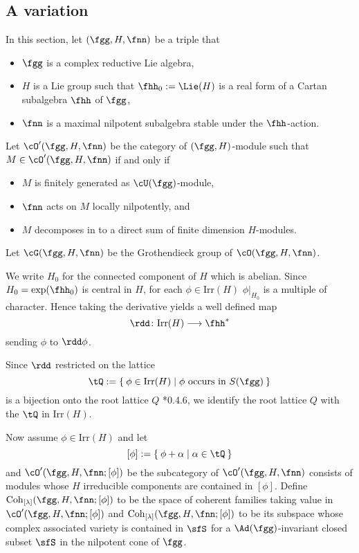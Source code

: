 \documentclass[12pt,a4paper]{amsart}
\numberwithin{equation}{section}
\theoremstyle{remark}
\def\Irr{\mathrm{Irr}}
\def\Coh{\mathrm{Coh}}
\def\dphi{\rdd \phi}
\begin{document}
%



\subsection{A variation}
In this section, let
$(\fgg, H,\fnn)$ be a triple that
\begin{itemize}
  \item $\fgg$ is a complex reductive Lie algebra,
  \item $H$ is a Lie group such that
        $\fhh_{0}:= \Lie(H)$ is a real form of
       a Cartan subalgebra  $\fhh$ of $\fgg$,
  \item $\fnn$ is a maximal nilpotent subalgebra
        stable under the $\fhh$-action.
\end{itemize}
Let $\cO'(\fgg, H,\fnn)$ be the category of $(\fgg, H)$-module such that
$M\in \cO'(\fgg,H,\fnn)$
if and only if
\begin{itemize}
  \item $M$ is finitely generated as $\cU(\fgg)$-module,
  \item $\fnn$ acts on $M$ locally nilpotently, and
  \item $M$ decomposes in to a direct sum of finite dimension $H$-modules.
\end{itemize}
Let $\Grt(\fgg,H,\fnn)$ be the Grothendieck group of $\cO(\fgg,H,\fnn)$.

We write $H_{0}$ for the connected component of $H$ which is abelian.
Since $H_{0} = \exp(\fhh_{0})$ is central in $H$, for each $\phi\in \Irr(H)$
$\phi|_{H_{0}}$ is a multiple of character.
Hence taking the derivative yields a
well defined map
\[
\rdd \colon \Irr(H)\longrightarrow \fhh^{*}
\]
sending $\phi$ to $\dphi$.


Since $\rdd$ restricted on the lattice
\[
\tQ:=\Set{\phi\in \Irr(H)|\phi \text{
    occurs in } S(\fgg)}
\]
 is a bijection onto the root lattice $Q$ \cite{Vg}*{0.4.6}, we identify the root lattice $Q$ with the $\tQ$ in $\Irr(H)$.


Now assume $\phi\in \Irr(H)$ and let
\[
  [\phi] := \Set{\phi+\alpha| \alpha\in \tQ}
\]
and
$\cO'(\fgg,H,\fnn;[\phi])$ be the subcategory of $\cO'(\fgg,H,\fnn)$
consists of modules whose $H$ irreducible components are contained in $[\phi]$.
Define $\Coh_{[\lambda]}(\fgg,H,\fnn;[\phi])$ to be the space of coherent
families taking value in $\cO'(\fgg,H,\fnn;[\phi])$ and
$\Coh_{[\lambda]}(\fgg,H,\fnn;[\phi])$ to be its subspace whose complex
associated variety is contained in $\sfS$ for a $\Ad(\fgg)$-invariant closed subset $\sfS$ in the nilpotent cone of
$\fgg$.
\end{document}
